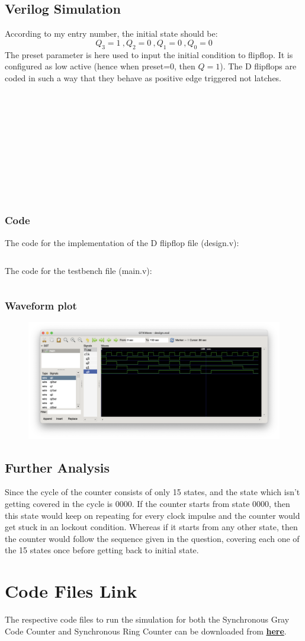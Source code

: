 \documentclass[a4paper]{article}
\begin{document}
\subsection{Verilog Simulation}
According to my entry number, the initial state should be: 
$$Q_{3}=1 \ ,Q_{2}=0 \ ,Q_{1}=0 \ ,Q_{0}=0$$
The preset parameter is here used to input the initial condition to flipflop. It is configured as low active (hence when preset=0, then $Q=1$). The D flipflops are coded in such a way that they behave as positive edge triggered not latches.
\\ \\ \\ \\ \\ \\ \\ \\ \\ \\ \\
\subsubsection{Code}
The code for the implementation of the D flipflop file (design.v):
\inputminted[bgcolor=bg,frame=lines,framesep=2mm,numbers=left]
{Verilog}{./code-files/q2/design.v}

The code for the testbench file (main.v):
\inputminted[bgcolor=bg,frame=lines,framesep=2mm,numbers=left]
{Verilog}{./code-files/q2/main.v}
\subsubsection{Waveform plot}
\begin{figure}[H]
    \centering
    \includegraphics[width=1.1\textwidth]{q2/plot.png}
\end{figure}
\subsection{Further Analysis}
Since the cycle of the counter consists of only 15 states, and the state which isn't getting covered in the cycle is $0000$. If the counter starts from state $0000$, then this state would keep on repeating for every clock impulse and the counter would get stuck in an lockout condition. Whereas if it starts from any other state, then the counter would follow the sequence given in the question, covering each one of the 15 states once before getting back to initial state.
\section{Code Files Link}
The respective code files to run the simulation for both the Synchronous Gray Code Counter and Synchronous Ring Counter can be downloaded from \href{https://drive.google.com/uc?export=download&id=1AyRVoMuTJadTvl_cF-rpAeVn3M3V_eTu}{\textbf{here}}.
\end{document}
